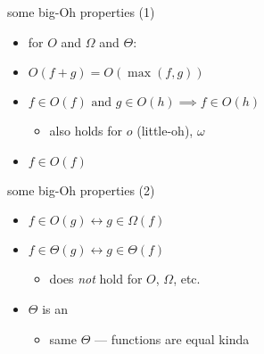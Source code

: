\begin{frame}{some big-Oh properties (1)} 
\newcommand{\biimplies}{\leftrightarrow}
\begin{itemize}
    \item for $O$ and $\Omega$ and $\Theta$:
    \item $O(f+g) = O(\max(f,g))$
    \item $f\in O(f)\text{ and }g\in O(h)\implies f \in O(h)$
        \begin{itemize}
        \item also holds for $o$ (little-oh), $\omega$
        \end{itemize}
    \item $f\in O(f)$
\end{itemize}
\end{frame}

\begin{frame}{some big-Oh properties (2)}
\newcommand{\biimplies}{\leftrightarrow}
\begin{itemize}
    \item $f \in O(g) \biimplies g \in \Omega(f)$
    \item $f\in\Theta(g) \biimplies g\in\Theta(f)$
        \begin{itemize}
        \item does \textit{not} hold for $O$, $\Omega$, etc.
        \end{itemize}
    \item $\Theta$ is an 
        \begin{itemize}
        \item same $\Theta$ --- functions are equal kinda
        \end{itemize}
\end{itemize}
\end{frame}
